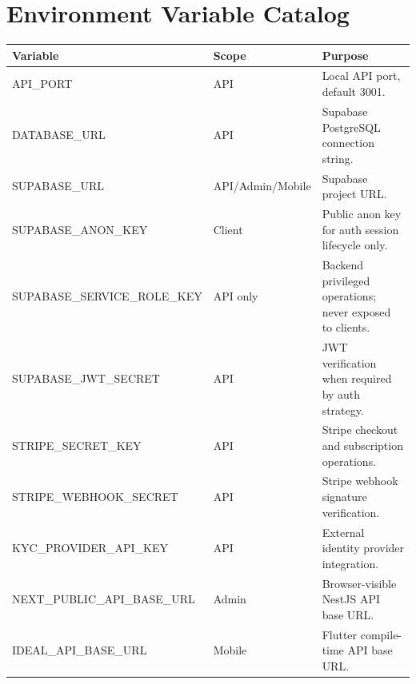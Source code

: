 \section{Environment Variable Catalog}
\begin{longtable}{p{}p{}p{}}
\toprule
Variable & Scope & Purpose \\
\midrule
API\_PORT & API & Local API port, default 3001. \\
DATABASE\_URL & API & Supabase PostgreSQL connection string. \\
SUPABASE\_URL & API/Admin/Mobile & Supabase project URL. \\
SUPABASE\_ANON\_KEY & Client & Public anon key for auth session lifecycle only. \\
SUPABASE\_SERVICE\_ROLE\_KEY & API only & Backend privileged operations; never exposed to clients. \\
SUPABASE\_JWT\_SECRET & API & JWT verification when required by auth strategy. \\
STRIPE\_SECRET\_KEY & API & Stripe checkout and subscription operations. \\
STRIPE\_WEBHOOK\_SECRET & API & Stripe webhook signature verification. \\
KYC\_PROVIDER\_API\_KEY & API & External identity provider integration. \\
NEXT\_PUBLIC\_API\_BASE\_URL & Admin & Browser-visible NestJS API base URL. \\
IDEAL\_API\_BASE\_URL & Mobile & Flutter compile-time API base URL. \\
\bottomrule
\end{longtable}
